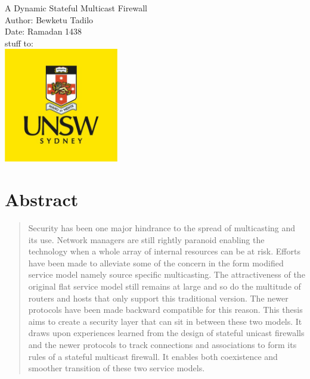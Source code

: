 \documentclass[11pt,left=2cm,bottom=2cm,oneside]{book}
\begin{document}
\pagenumbering{}
\begin{titlepage}
\nopagebreak
\centering
{\LARGE A Dynamic Stateful Multicast Firewall}\\
\vspace*{2cm}
{\Large Author: Bewketu Tadilo}\\
\vspace*{2cm}
{\Large Date: Ramadan 1438}\\
\vspace{2cm}
{\hspace{-3cm}\Large stuff to:}\\
\vspace{6cm}
\includegraphics[height=5cm]{unsw-logo.jpg}
\end{titlepage}
\clearpage

 \section*{\centering Abstract}
\begin{quotation}
Security has been one major hindrance to the spread of multicasting and its use. Network managers are still rightly paranoid
enabling the technology when a whole array of internal resources
can be at risk. Efforts have been made to alleviate some of the
concern in the form modified service model namely source specific
multicasting. The attractiveness of the original flat service model
still remains at large and so do the multitude of routers and hosts
that only support this traditional version. The newer protocols
have been made backward compatible for this reason. This thesis aims to create a security layer that can sit in between these
two models. It draws upon experiences learned from the design
of stateful unicast firewalls and the newer protocols to track connections and associations to form its rules of a stateful multicast
firewall. It enables both coexistence and smoother transition of
these two service models.
\end{quotation}
\clearpage
\vspace*{8cm}
\end{document}
